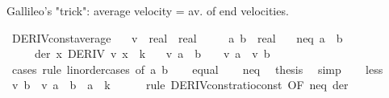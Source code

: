 \begin{isabellebody}
%
\begin{isamarkuptext}%
Gallileo's "trick": average velocity = av. of end velocities.%
\end{isamarkuptext}\isamarkuptrue%
\isamarkupfalse%
\ DERIV{\isacharunderscore}{\kern0pt}const{\isacharunderscore}{\kern0pt}average{\isacharcolon}{\kern0pt}\isanewline
\ \ \ v\ {\isacharcolon}{\kern0pt}{\isacharcolon}{\kern0pt}\ {\isachardoublequoteopen}real\ {\isasymRightarrow}\ real{\isachardoublequoteclose}\isanewline
\ \ \ \ \ a\ b\ {\isacharcolon}{\kern0pt}{\isacharcolon}{\kern0pt}\ real\isanewline
\ \ \ neq{\isacharcolon}{\kern0pt}\ {\isachardoublequoteopen}a\ {\isasymnoteq}\ b{\isachardoublequoteclose}\isanewline
\ \ \ \ \ der{\isacharcolon}{\kern0pt}\ {\isachardoublequoteopen}{\isasymAnd}x{\isachardot}{\kern0pt}\ DERIV\ v\ x\ {\isacharcolon}{\kern0pt}{\isachargreater}{\kern0pt}\ k{\isachardoublequoteclose}\isanewline
\ \ \ {\isachardoublequoteopen}v\ {\isacharparenleft}{\kern0pt}{\isacharparenleft}{\kern0pt}a\ {\isacharplus}{\kern0pt}\ b{\isacharparenright}{\kern0pt}\ {\isacharslash}{\kern0pt}\ {}{\isacharparenright}{\kern0pt}\ {\isacharequal}{\kern0pt}\ {\isacharparenleft}{\kern0pt}v\ a\ {\isacharplus}{\kern0pt}\ v\ b{\isacharparenright}{\kern0pt}\ {\isacharslash}{\kern0pt}\ {}{\isachardoublequoteclose}\isanewline
%
\isadelimproof
%
\endisadelimproof
%
\isatagproof
{}\isamarkupfalse%
\ {\isacharparenleft}{\kern0pt}cases\ rule{\isacharcolon}{\kern0pt}\ linorder{\isacharunderscore}{\kern0pt}cases\ {\isacharbrackleft}{\kern0pt}of\ a\ b{\isacharbrackright}{\kern0pt}{\isacharparenright}{\kern0pt}\isanewline
\ \ \isamarkupfalse%
\ equal\isanewline
\ \ \isamarkupfalse%
\ neq\ \isamarkupfalse%
\ {\isacharquery}{\kern0pt}thesis\ \isamarkupfalse%
\ simp\isanewline
{}\isamarkupfalse%
\isanewline
\ \ \isamarkupfalse%
\ less\isanewline
\ \ \isamarkupfalse%
\ {\isachardoublequoteopen}{\isacharparenleft}{\kern0pt}v\ b\ {\isacharminus}{\kern0pt}\ v\ a{\isacharparenright}{\kern0pt}\ {\isacharslash}{\kern0pt}\ {\isacharparenleft}{\kern0pt}b\ {\isacharminus}{\kern0pt}\ a{\isacharparenright}{\kern0pt}\ {\isacharequal}{\kern0pt}\ k{\isachardoublequoteclose}\isanewline
\ \ \ \ \isamarkupfalse%
\ {\isacharparenleft}{\kern0pt}rule\ DERIV{\isacharunderscore}{\kern0pt}const{\isacharunderscore}{\kern0pt}ratio{\isacharunderscore}{\kern0pt}const{}\ {\isacharbrackleft}{\kern0pt}OF\ neq\ der{\isacharbrackright}{\kern0pt}{\isacharparenright}{\kern0pt}\isanewline

\end{isabellebody}
